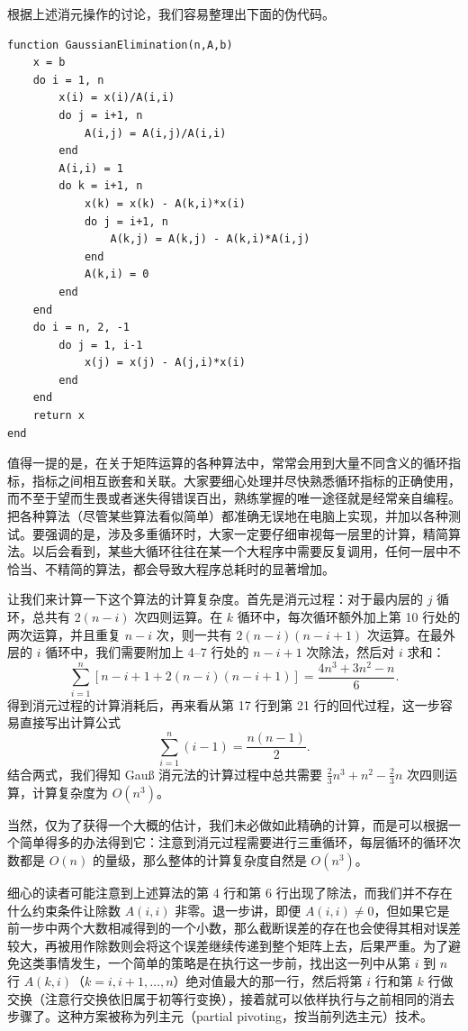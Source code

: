 根据上述消元操作的讨论，我们容易整理出下面的伪代码。

\begin{algorithmBox}
\begin{lstlisting}[style=bellacode]
function GaussianElimination(n,A,b)
    x = b
    do i = 1, n
        x(i) = x(i)/A(i,i)
        do j = i+1, n
            A(i,j) = A(i,j)/A(i,i)
        end
        A(i,i) = 1
        do k = i+1, n
            x(k) = x(k) - A(k,i)*x(i)
            do j = i+1, n
                A(k,j) = A(k,j) - A(k,i)*A(i,j)
            end
            A(k,i) = 0
        end
    end
    do i = n, 2, -1
        do j = 1, i-1
            x(j) = x(j) - A(j,i)*x(i)
        end
    end
    return x
end
\end{lstlisting}
\end{algorithmBox}

值得一提的是，在关于矩阵运算的各种算法中，常常会用到大量不同含义的循环指标，指标之间相互嵌套和关联。大家要细心处理并尽快熟悉循环指标的正确使用，而不至于望而生畏或者迷失得错误百出，熟练掌握的唯一途径就是经常亲自编程。把各种算法（尽管某些算法看似简单）都准确无误地在电脑上实现，并加以各种测试。要强调的是，涉及多重循环时，大家一定要仔细审视每一层里的计算，精简算法。以后会看到，某些大循环往往在某一个大程序中需要反复调用，任何一层中不恰当、不精简的算法，都会导致大程序总耗时的显著增加。

让我们来计算一下这个算法的计算复杂度。首先是消元过程：对于最内层的 $j$ 循环，总共有 $2(n-i)$ 次四则运算。在 $k$ 循环中，每次循环额外加上第 10 行处的两次运算，并且重复 $n-i$ 次，则一共有 $2(n-i)(n-i+1)$ 次运算。在最外层的 $i$ 循环中，我们需要附加上 4--7 行处的 $n-i+1$ 次除法，然后对 $i$ 求和：
\[
\sum_{i=1}^{n}\left[n-i+1+2(n-i)(n-i+1)\right]=\frac{4n^3+3n^2-n}{6}.
\]
得到消元过程的计算消耗后，再来看从第 17 行到第 21 行的回代过程，这一步容易直接写出计算公式
\[
\sum_{i=1}^{n}(i-1)=\frac{n(n-1)}{2}.
\]
结合两式，我们得知 Gauß 消元法的计算过程中总共需要 $\frac23n^3+n^2-\frac23n$ 次四则运算，计算复杂度为 $O(n^3)$。

当然，仅为了获得一个大概的估计，我们未必做如此精确的计算，而是可以根据一个简单得多的办法得到它：注意到消元过程需要进行三重循环，每层循环的循环次数都是 $O(n)$ 的量级，那么整体的计算复杂度自然是 $O(n^3)$。

细心的读者可能注意到上述算法的第 4 行和第 6 行出现了除法，而我们并不存在什么约束条件让除数 $A(i,i)$ 非零。退一步讲，即便 $A(i,i)\ne0$，但如果它是前一步中两个大数相减得到的一个小数，那么截断误差的存在也会使得其相对误差较大，再被用作除数则会将这个误差继续传递到整个矩阵上去，后果严重。为了避免这类事情发生，一个简单的策略是在执行这一步前，找出这一列中从第 $i$ 到 $n$ 行 $A(k,i)$（$k=i,i+1,\ldots,n$）绝对值最大的那一行，然后将第 $i$ 行和第 $k$ 行做交换（注意行交换依旧属于初等行变换），接着就可以依样执行与之前相同的消去步骤了。这种方案被称为列主元（partial pivoting，按当前列选主元）技术。

